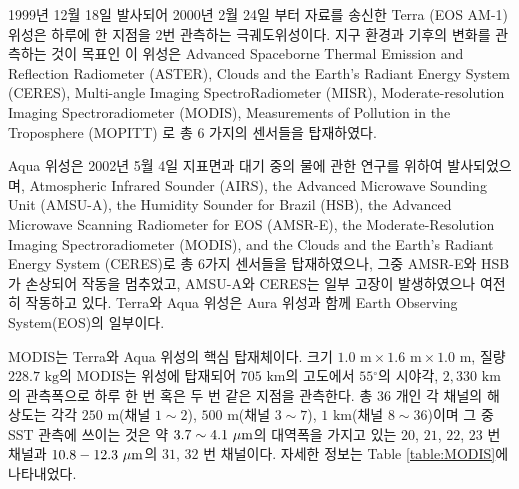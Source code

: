 1999년 12월 18일 발사되어 2000년 2월 24일 부터 자료를 송신한 Terra (EOS AM-1) 위성은 하루에 한 지점을 2번 관측하는 극궤도위성이다. 지구 환경과 기후의 변화를 관측하는 것이 목표인 이 위성은 Advanced Spaceborne Thermal Emission and Reflection Radiometer (ASTER), Clouds and the Earth's Radiant Energy System (CERES), Multi-angle Imaging SpectroRadiometer (MISR), Moderate-resolution Imaging Spectroradiometer (MODIS),  Measurements of Pollution in the Troposphere (MOPITT) 로 총 6 가지의 센서들을 탑재하였다. 

Aqua 위성은 2002년 5월 4일 지표면과 대기 중의 물에 관한 연구를 위하여 발사되었으며, Atmospheric Infrared Sounder (AIRS), the Advanced Microwave Sounding Unit (AMSU-A), the Humidity Sounder for Brazil (HSB), the Advanced Microwave Scanning Radiometer for EOS (AMSR-E), the Moderate-Resolution Imaging Spectroradiometer (MODIS), and the Clouds and the Earth's Radiant Energy System (CERES)로 총 6가지 센서들을 탑재하였으나, 그중 AMSR-E와 HSB가 손상되어 작동을 멈추었고, AMSU-A와 CERES는 일부 고장이 발생하였으나 여전히 작동하고 있다. Terra와 Aqua 위성은 Aura 위성과 함께 Earth Observing System(EOS)의 일부이다. 

MODIS는 Terra와 Aqua 위성의 핵심 탑재체이다. 크기 $1.0\textrm{ m} \times 1.6 \textrm{ m} \times 1.0 \textrm{ m}$, 질량 $228.7 \textrm{ kg}$의 MODIS는 위성에 탑재되어 $705 \textrm{ km}$의 고도에서 $55 {^\circ}$의 시야각, $2,330 \textrm{ km}$의 관측폭으로 하루 한 번 혹은 두 번 같은 지점을 관측한다. 총 $36$ 개인 각 채널의 해상도는 각각 $250 \textrm{ m}$(채널 $1 \sim 2$), $500 \textrm{ m}$(채널 $3 \sim 7$), $1 \textrm{ km}$(채널 $8 \sim 36$)이며 그 중 SST 관측에 쓰이는 것은 약 $3.7 \sim 4.1 \textrm{ }\rm{\mu m}$의 대역폭을 가지고 있는 $20$, $21$, $22$, $23$ 번 채널과 $10.8 - 12.3 \textrm{ }\rm{\mu m}$의 $31$, $32$ 번 채널이다. 자세한 정보는 Table \ref{table:MODIS}에 나타내었다.


